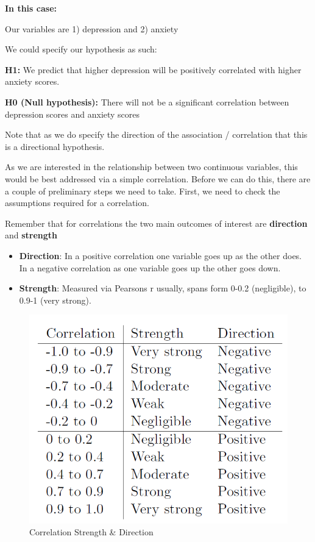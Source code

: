 \documentclass[
]{book}
\begin{document}
\textbf{In this case:}

Our variables are 1) depression and 2) anxiety

We could specify our hypothesis as such:

\textbf{H1:} We predict that higher depression will be positively correlated with higher anxiety scores.

\textbf{H0 (Null hypothesis):} There will not be a significant correlation between depression scores and anxiety scores

Note that as we do specify the direction of the association / correlation that this is a directional hypothesis.

As we are interested in the relationship between two continuous variables, this would be best addressed via a simple correlation. Before we can do this, there are a couple of preliminary steps we need to take. First, we need to check the assumptions required for a correlation.

Remember that for correlations the two main outcomes of interest are \textbf{direction} and \textbf{strength}

\begin{itemize}
\item
  \textbf{Direction}: In a positive correlation one variable goes up as the other does. In a negative correlation as one variable goes up the other goes down.
\item
  \textbf{Strength}: Measured via Pearsons r usually, spans form 0-0.2 (negligible), to 0.9-1 (very strong).
\end{itemize}

\begin{figure}
\centering
\includegraphics{img/StrenDir.png}
\caption{Correlation Strength \& Direction}
\end{figure}
\end{document}
